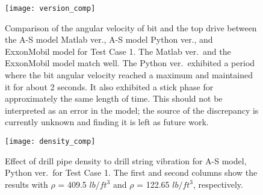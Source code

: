 \begin{figure}
  \centering
  \texttt{[image: version\_comp]}
  \caption[Comparison between different models for Test Case 1]{Comparison of the angular velocity of bit and the top drive between the A-S model Matlab ver., A-S model Python ver., and ExxonMobil model for Test Case 1. The Matlab ver.\ and the ExxonMobil model match well. The Python ver.\ exhibited a period where the bit angular velocity reached a maximum and maintained it for about 2 seconds. It also exhibited a stick phase for approximately the same length of time. This should not be interpreted as an error in the model; the source of the discrepancy is currently unknown and finding it is left as future work.}
  \label{figure_Test1_comp_chASmodel}
\end{figure}

\begin{figure}
  \centering
  \texttt{[image: density\_comp]}
  \caption[Effect of drill pipe density in Python ver.\ for Test Case 1]{Effect of drill pipe density to drill string vibration for A-S model, Python ver.\ for Test Case 1. The first and second columns show the results with $\rho$ = 409.5 $lb/ft^3$ and  $\rho$ = 122.65 $lb/ft^3$, respectively.}\label{figure_Python_reducedDensity}
\end{figure}


